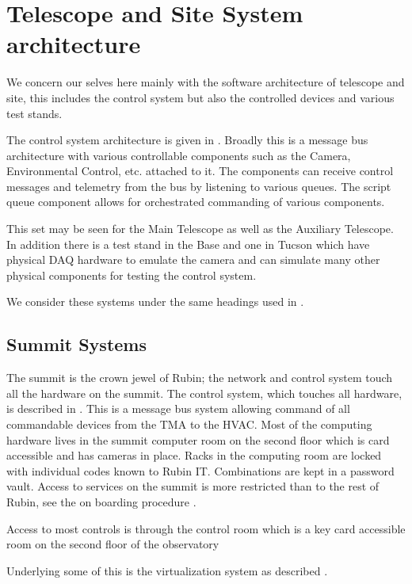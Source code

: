 \section{Telescope and Site  System architecture} \label{sec:tsarc}

 We concern our selves here mainly with the software architecture of telescope and site,
this includes the control system but also the controlled devices and various test stands.

The control system architecture is given in .
Broadly this is a message bus architecture with  various controllable components such as the Camera, Environmental Control, etc. attached to it.
The components can receive control messages and telemetry from the bus by listening to various queues.
The script queue component allows for orchestrated commanding of various components.

This set may be seen for the Main Telescope as well as the Auxiliary Telescope.
In addition there is a test stand in the Base and one in Tucson which have physical DAQ hardware to emulate the camera and can simulate many other physical components for testing the control system.

We consider these systems under the same headings used in .





\subsection{Summit Systems}
The summit is the crown jewel of Rubin; the network and control system touch all the hardware on the summit.
The control system, which touches all hardware, is described in .
This is a message bus system allowing command of all commandable devices from the \gls{TMA} to the \gls{HVAC}.
Most of the computing hardware lives in the summit computer room on the second floor  which is card accessible and has cameras in place.
Racks in the computing room are locked with individual codes known to Rubin IT.
Combinations are kept in a password vault.
Access to services on the summit is more restricted than to the rest of Rubin, see the on boarding procedure .

Access to most controls is through the control room which is a key card accessible room on the second floor of the observatory



Underlying some of this is the virtualization system as described .



